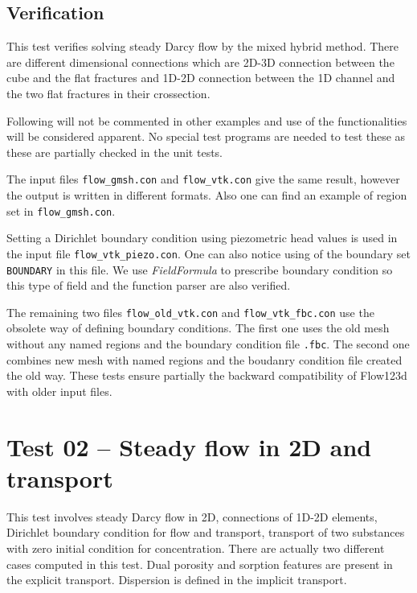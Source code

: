 \subsection*{Verification}
This test verifies solving steady Darcy flow by the mixed hybrid method. There are different dimensional connections 
which are 2D-3D connection between the cube and the flat fractures and 1D-2D connection between the 1D channel 
and the two flat fractures in their crossection. 

Following will not be commented in other examples and use of the functionalities will be considered apparent. No special test
programs are needed to test these as these are partially checked in the unit tests.

The input files \verb'flow_gmsh.con' and \verb'flow_vtk.con' give the same result, however the output is written in different 
formats. Also one can find an example of region set in \verb'flow_gmsh.con'.

Setting a Dirichlet boundary condition using piezometric head values is used in the input file \verb'flow_vtk_piezo.con'.
One can also notice using of the boundary set \verb'BOUNDARY' in this file. We use \emph{FieldFormula} to prescribe boundary
condition so this type of field and the function parser are also verified.

The remaining two files \verb'flow_old_vtk.con' and \verb'flow_vtk_fbc.con' use the obsolete way of defining boundary conditions.
The first one uses the old mesh without any named regions and the boundary condition file \verb'.fbc'. The second one combines
new mesh with named regions and the boudanry condition file created the old way. These tests ensure partially the backward 
compatibility of Flow123d with older input files.


\section{Test 02 -- Steady flow in 2D and transport}
\label{sec:test02}
This test involves steady Darcy flow in 2D, connections of 1D-2D elements, Dirichlet boundary condition for flow and transport, 
transport of two substances with zero initial condition for concentration. There are actually two different cases computed in this test. 
Dual porosity and sorption features are present in the explicit transport. Dispersion is defined in the implicit transport.

